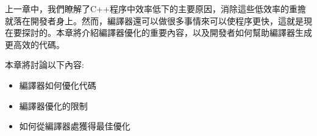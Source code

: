 上一章中，我們瞭解了C++程序中效率低下的主要原因，消除這些低效率的重擔就落在開發者身上。然而，編譯器還可以做很多事情來可以使程序更快，這就是現在要探討的。本章將介紹編譯器優化的重要內容，以及開發者如何幫助編譯器生成更高效的代碼。 

本章將討論以下內容:

\begin{itemize}
\item
編譯器如何優化代碼

\item
編譯器優化的限制

\item
如何從編譯器處獲得最佳優化
\end{itemize}